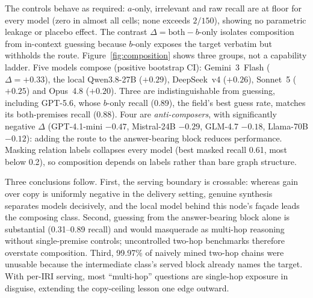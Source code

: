 \documentclass[10pt,twocolumn]{article}
\begin{document}
The controls behave as required: $a$-only, irrelevant and raw recall are at floor for every
model (zero in almost all cells; none exceeds $2/150$), showing no parametric leakage or placebo
effect. The contrast $\Delta=\text{both}-b\text{-only}$ isolates composition from in-context
guessing because $b$-only exposes the target verbatim but withholds the route.
Figure~\ref{fig:composition} shows three groups, not a capability ladder. Five models compose
(positive bootstrap CI): Gemini~3~Flash ($\Delta=+0.33$), the local Qwen3.8-27B ($+0.29$),
DeepSeek~v4 ($+0.26$), Sonnet~5 ($+0.25$) and Opus~4.8 ($+0.20$). Three are indistinguishable
from guessing, including GPT-5.6, whose $b$-only recall (0.89), the field's best guess rate,
matches its both-premises recall (0.88). Four are \emph{anti-composers}, with significantly
negative $\Delta$ (GPT-4.1-mini $-0.47$, Mistral-24B $-0.29$, GLM-4.7 $-0.18$, Llama-70B
$-0.12$): adding the route to the answer-bearing block reduces performance. Masking relation
labels collapses every model (best masked recall 0.61, most below 0.2), so composition depends
on labels rather than bare graph structure.

Three conclusions follow. First, the serving boundary is crossable: whereas gain over copy is
uniformly negative in the delivery setting, genuine synthesis separates models decisively, and
the local model behind this node's fa\c{c}ade leads the composing class. Second, guessing from
the answer-bearing block alone is substantial (0.31--0.89 recall) and would masquerade as
multi-hop reasoning without single-premise controls; uncontrolled two-hop benchmarks therefore
overstate composition. Third, 99.97\% of naively mined two-hop chains were unusable because the
intermediate class's served block already names the target. With per-IRI serving, most
``multi-hop'' questions are single-hop exposure in disguise, extending the copy-ceiling lesson
one edge outward.
\end{document}

